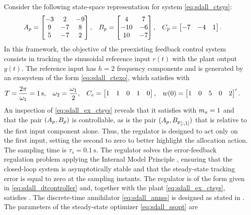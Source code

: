 \begin{example}
  \label{ex:sdall}
  Consider the following state-space representation for system \eqref{eq:sdall_ctsys}:
  \begin{align}
    \label{eq:sdall_ex_ctsys}
    A_p &= \begin{bmatrix}
      -3 & 2 & -9\\
      9 & -7 & 8\\
      5 & -7 & 2\end{bmatrix}, & B_p &= \begin{bmatrix}
      4 & 7\\
      -10 & -6\\
      10 & -7\end{bmatrix}, & C_p &= \begin{bmatrix}
      -7 & -4 & 1\end{bmatrix}.
  \end{align}
  In this framework, the objective of the preexisting feedback control system consists in tracking the sinusoidal reference input $r(t)$ with the plant output $y(t)$. The reference input has $h=2$ frequency components and is generated by an exosystem of the form \eqref{eq:sdall_ctexo}, which satisfies  with
  \begin{align}
    \label{eq:sdall_ex_ctexodata}
    T &= \frac{2\pi}{\omega_1} = \SI{1}{\second}, & \omega_2 &= \frac{\omega_1}{2}, & C_e &= \begin{bmatrix}1 & 1 & 0 & 1 & 0\end{bmatrix}, & w(0) &= \begin{bmatrix}1 & 0 & 5 & 0 & 2\end{bmatrix}'.
  \end{align}
  An inspection of \eqref{eq:sdall_ex_ctsys} reveals that it satisfies  with $m_a=1$ and that the pair $(A_p,B_p)$ is controllable, as is the pair $(A_p,{B_p}_{\left[:,1\right]})$ that is relative to the first input component alone. Thus, the regulator is designed to act only on the first input, setting the second to zero to better highlight the allocation action. The sampling time is $\tau_s=\SI{0.1}{\second}$. The regulator solves the error-feedback regulation problem applying the Internal Model Principle \cite{francis_internal_1975}, ensuring that the closed-loop system is asymptotically stable and that the steady-state tracking error is equal to zero at the sampling instants. The regulator is of the form given in \eqref{eq:sdall_dtcontroller} and, together with the plant \eqref{eq:sdall_ex_ctsys}, satisfies . The discrete-time annihilator \eqref{eq:sdall_annss} is designed as stated in . The parameters of the steady-state optimizer \eqref{eq:sdall_ssopt} are

\end{example}
